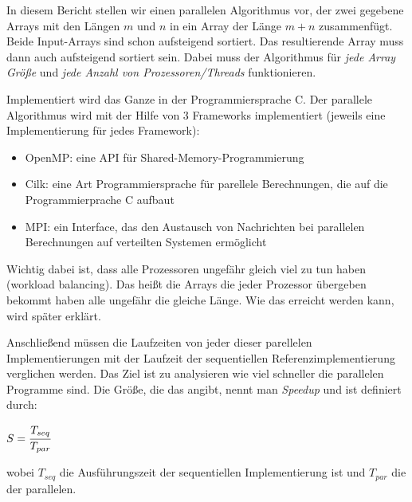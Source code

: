 In diesem Bericht stellen wir einen parallelen Algorithmus vor, der zwei gegebene Arrays mit den Längen $m$ und $n$ in ein Array der Länge $m + n$ zusammenfügt. Beide Input-Arrays sind schon aufsteigend sortiert. Das resultierende Array muss dann auch aufsteigend sortiert sein. Dabei muss der Algorithmus für \emph{jede Array Größe} und \emph{jede Anzahl von Prozessoren/Threads} funktionieren.

Implementiert wird das Ganze in der Programmiersprache C. Der parallele Algorithmus wird mit der Hilfe von 3  Frameworks implementiert (jeweils eine Implementierung für jedes Framework):
\begin{itemize}
\item OpenMP: eine API für Shared-Memory-Programmierung
\item Cilk: eine Art Programmiersprache für parellele Berechnungen, die auf die Programmierprache C aufbaut
\item MPI: ein Interface, das den Austausch von Nachrichten  bei parallelen Berechnungen auf verteilten Systemen ermöglicht
\end{itemize}
Wichtig dabei ist, dass alle Prozessoren ungefähr gleich viel zu tun haben (workload balancing). Das heißt die Arrays die jeder Prozessor übergeben bekommt haben alle ungefähr die gleiche Länge. Wie das erreicht werden kann, wird später erklärt.

Anschließend müssen die Laufzeiten von jeder dieser parellelen Implementierungen mit der Laufzeit der sequentiellen Referenzimplementierung verglichen werden. Das Ziel ist zu analysieren wie viel schneller die parallelen Programme sind. Die Größe, die das angibt, nennt man \emph{Speedup} und ist definiert durch:
\begin{center}
$ S = \cfrac{T_{seq}}{T_{par}}$
\end{center}
wobei $T_{seq}$ die Ausführungszeit der sequentiellen Implementierung ist und $T_{par}$ die der parallelen.